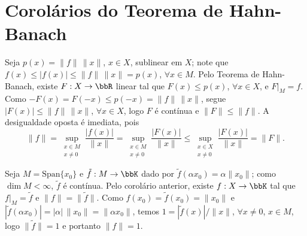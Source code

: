 \section{Corolários do Teorema de Hahn-Banach}

\begin{myproof}
	Seja $p(x)=\|f\|\,\|x\|$, $x\in X$, sublinear em $X$; note que $f(x)\leq|f(x)|\leq\|f\|\,\|x\|=p(x)$,
	$\forall x\in M$. Pelo Teorema de Hahn-Banach, existe $F:X\to\bbR$ linear tal que $F(x)\leq p(x)$,
	$\forall x\in X$, e $F|_M=f$. Como $-F(x)=F(-x)\leq p(-x)=\|f\|\,\|x\|$, segue $|F(x)|\leq\|f\|\,\|x\|$,
	$\forall x\in X$, logo $F$ é contínua e $\|F\|\leq\|f\|$. A desigualdade oposta é imediata, pois
	$$\|f\|=\sup_{\substack{x\in M\\x\neq 0}}\frac{|f(x)|}{\|x\|}=\sup_{\substack{x\in M\\x\neq
	0}}\frac{|F(x)|}{\|x\|}\leq\sup_{\substack{x\in X\\x\neq 0}}\frac{|F(x)|}{\|x\|}=\|F\|\text{.}$$
\end{myproof}

\begin{myproof}
	Seja $M=\text{Span}\{x_0\}$ e $\tilde f:M\to\bbK$ dado por $\tilde f(\alpha x_0)=\alpha\|x_0\|$; como
	$\dim M<\infty$, $\tilde f$ é contínua. Pelo corolário anterior, existe $f:X\to\bbK$ tal que
	$f|_M=\tilde f$ e $\|f\|=\|\tilde f\|$. Como $f(x_0)=\tilde f(x_0)=\|x_0\|$ e
	$|\tilde f(\alpha x_0)|=|\alpha|\,\|x_0\|=\|\alpha x_0\|$, temos
	$1=|\tilde f(x)|/\|x\|$, $\forall x\neq 0$, $x\in M$, logo $\|\tilde f\|=1$ e portanto $\|f\|=1$.
\end{myproof}



